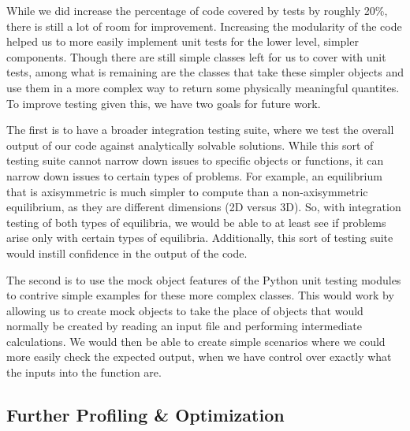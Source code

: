 \documentclass{article}
\begin{document}
While we did increase the percentage of code covered by tests by roughly 20\%, there is still a lot of room for improvement.
Increasing the modularity of the code helped us to more easily implement unit tests for the lower level, simpler components.
Though there are still simple classes left for us to cover with unit tests, among what is remaining are the classes that take these simpler objects and use them in a more complex way to return some physically meaningful quantites.
To improve testing given this, we have two goals for future work.

The first is to have a broader integration testing suite, where we test the overall output of our code against analytically solvable solutions.
While this sort of testing suite cannot narrow down issues to specific objects or functions, it can narrow down issues to certain types of problems.
For example, an equilibrium that is axisymmetric is much simpler to compute than a non-axisymmetric equilibrium, as they are different dimensions (2D versus 3D).
So, with integration testing of both types of equilibria, we would be able to at least see if problems arise only with certain types of equilibria.
Additionally, this sort of testing suite would instill confidence in the output of the code.

The second is to use the mock object features of the Python unit testing modules to contrive simple examples for these more complex classes.
This would work by allowing us to create mock objects to take the place of objects that would normally be created by reading an input file and performing intermediate calculations.
We would then be able to create simple scenarios where we could more easily check the expected output, when we have control over exactly what the inputs into the function are.

\subsection{Further Profiling \& Optimization}
\end{document}

